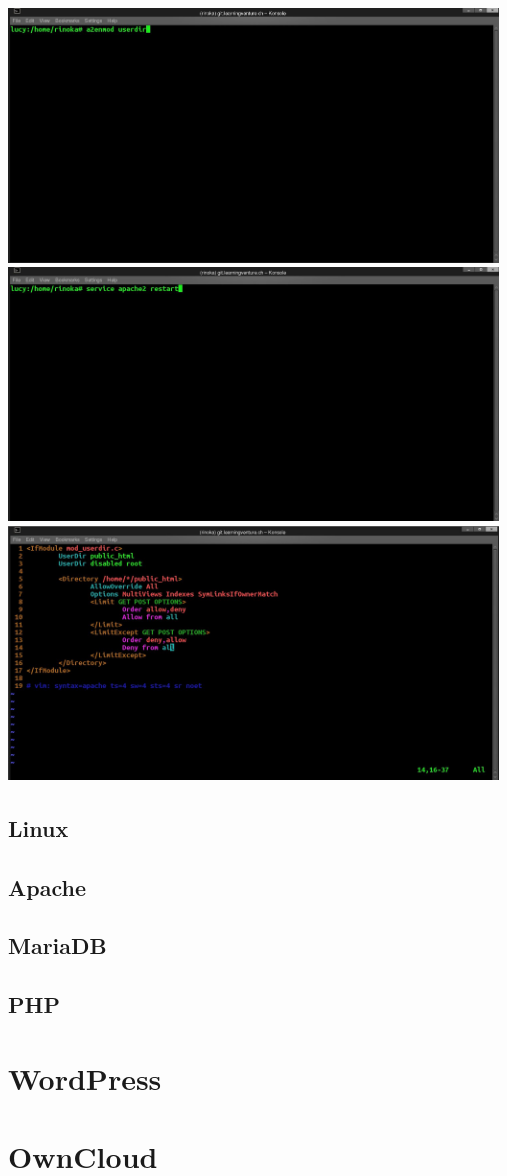 \documentclass{article}
\begin{document}
	\includegraphics[width=13cm]{../Pics/a2enmod_userdir}
	\includegraphics[width=13cm]{../Pics/apach2restart}
	\includegraphics[width=13cm]{../Pics/6_userdirconf}
	\subsection{Linux}
	\subsection{Apache}
	\subsection{MariaDB}
	\subsection{PHP}
	\section{WordPress}
	\section{OwnCloud}
\end{document}
